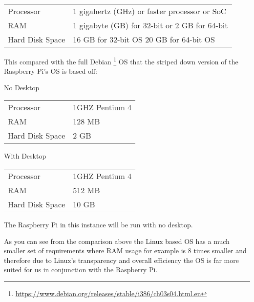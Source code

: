 \vspace{5mm} 
\begin{center}
\begin{tabular}{| l | l |}
	\hline
	Processor & 1 gigahertz (GHz) or faster processor or SoC \\
	RAM & 1 gigabyte (GB) for 32-bit or 2 GB for 64-bit \\
	Hard Disk Space & 16 GB for 32-bit OS 20 GB for 64-bit OS \\
	\hline
\end{tabular}
\vspace{5mm} 
\end{center}

This compared with the full Debian \footnote{\url{https://www.debian.org/releases/stable/i386/ch03s04.html.en}} OS that the striped down version of the Raspberry Pi's OS is based off:

\begin{center}
No Desktop\\
\vspace{1mm} 
\begin{tabular}{| l | l |}
	\hline
	Processor & 1GHZ Pentium 4 \\
	RAM & 128 MB \\
	Hard Disk Space & 2 GB \\
	\hline
\end{tabular}

\vspace{2.5mm}
With Desktop\\
\vspace{1mm}
\begin{tabular}{| l | l |}
	\hline
	Processor & 1GHZ Pentium 4 \\
	RAM & 512 MB \\
	Hard Disk Space & 10 GB \\
	\hline
\end{tabular}
\vspace{5mm}
\end{center}

The Raspberry Pi in this instance will be run with no desktop.

As you can see from the comparison above the Linux based OS has a much smaller set of requirements where RAM usage for example is 8 times smaller and therefore due to Linux's transparency and overall efficiency the OS is far more suited for us in conjunction with the Raspberry Pi.

